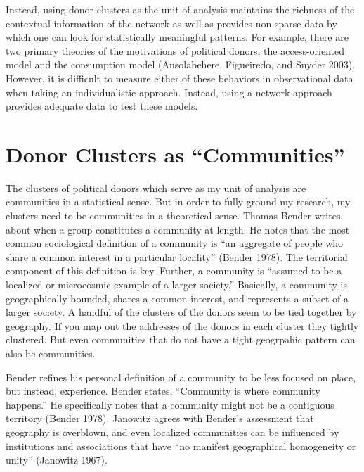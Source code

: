 \documentclass[12pt,]{article}
\begin{document}
Instead, using donor clusters as the unit of analysis maintains the
richness of the contextual information of the network as well as
provides non-sparse data by which one can look for statistically
meaningful patterns. For example, there are two primary theories of the
motivations of political donors, the access-oriented model and the
consumption model (Ansolabehere, Figueiredo, and Snyder 2003). However,
it is difficult to measure either of these behaviors in observational
data when taking an individualistic approach. Instead, using a network
approach provides adequate data to test these models.

\hypertarget{donor-clusters-as-communities}{%
\section{Donor Clusters as
``Communities''}\label{donor-clusters-as-communities}}

The clusters of political donors which serve as my unit of analysis are
communities in a statistical sense. But in order to fully ground my
research, my clusters need to be communities in a theoretical sense.
Thomas Bender writes about when a group constitutes a community at
length. He notes that the most common sociological definition of a
community is ``an aggregate of people who share a common interest in a
particular locality'' (Bender 1978). The territorial component of this
definition is key. Further, a community is ``assumed to be a localized
or microcosmic example of a larger society.'' Basically, a community is
geographically bounded, shares a common interest, and represents a
subset of a larger society. A handful of the clusters of the donors seem
to be tied together by geography. If you map out the addresses of the
donors in each cluster they tightly clustered. But even communities that
do not have a tight geogrpahic pattern can also be communities.

Bender refines his personal definition of a community to be less focused
on place, but instead, experience. Bender states, ``Community is where
community happens.'' He specifically notes that a community might not be
a contiguous territory (Bender 1978). Janowitz agrees with Bender's
assessment that geography is overblown, and even localized communities
can be influenced by institutions and associations that have ``no
manifest geographical homogeneity or unity'' (Janowitz 1967).
\end{document}
